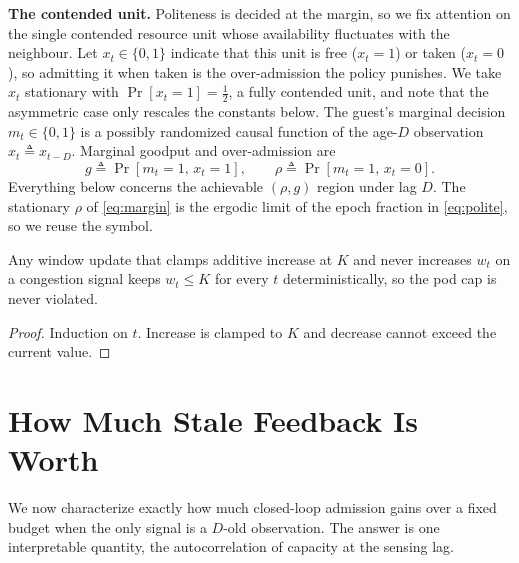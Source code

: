 \noindent\textbf{The contended unit.}
Politeness is decided at the margin, so we fix attention on the single contended
resource unit whose availability fluctuates with the neighbour. Let
$x_t\in\{0,1\}$ indicate that this unit is free ($x_t=1$) or taken ($x_t=0$), so
admitting it when taken is the over-admission the policy punishes. We take $x_t$
stationary with $\Pr[x_t=1]=\tfrac12$, a fully contended unit, and note that the
asymmetric case only rescales the constants below. The guest's marginal decision
$m_t\in\{0,1\}$ is a possibly randomized causal function of the age-$D$
observation $\hat x_t\triangleq x_{t-D}$. Marginal goodput and over-admission are
\begin{equation}\label{eq:margin}
g \triangleq \Pr[m_t=1,\,x_t=1],\qquad
\rho \triangleq \Pr[m_t=1,\,x_t=0].
\end{equation}
Everything below concerns the achievable $(\rho,g)$ region under lag $D$. The
stationary $\rho$ of \eqref{eq:margin} is the ergodic limit of the epoch fraction
in \eqref{eq:polite}, so we reuse the symbol.

\begin{proposition}\label{prop:safety}
Any window update that clamps additive increase at $K$ and never increases $w_t$
on a congestion signal keeps $w_t\le K$ for every $t$ deterministically, so the
pod cap is never violated.
\end{proposition}
\begin{proof}
Induction on $t$. Increase is clamped to $K$ and decrease cannot exceed the
current value.
\end{proof}

\section{How Much Stale Feedback Is Worth}
\label{sec:limit}

We now characterize exactly how much closed-loop admission gains over a fixed
budget when the only signal is a $D$-old observation. The answer is one
interpretable quantity, the autocorrelation of capacity at the sensing lag.

